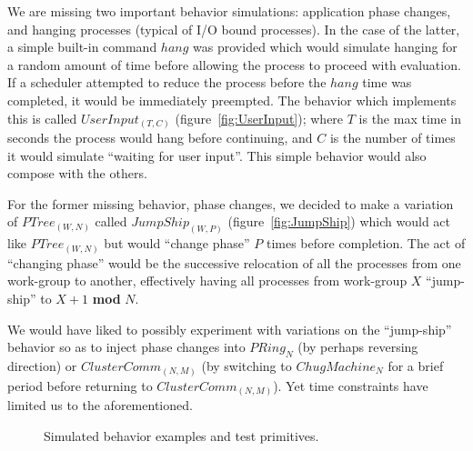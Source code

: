 We are missing two important behavior simulations: application phase changes,
and hanging processes (typical of I/O bound processes). In the case of the 
latter, a simple built-in command $hang$ was provided which would simulate 
hanging for a random amount of time before allowing the process to proceed with
evaluation. If a scheduler attempted to reduce the process before the $hang$ 
time was completed, it would be immediately preempted. The behavior which 
implements this is called $UserInput_{(T,C)}$ (figure~\ref{fig:UserInput}); where $T$ is the max time in seconds
the process would hang before continuing, and $C$ is the number of times it 
would simulate ``waiting for user input''. This simple behavior would also
compose with the others.

For the former missing behavior, phase changes, we decided to make a variation
of $PTree_{(W,N)}$ called $JumpShip_{(W,P)}$ (figure~\ref{fig:JumpShip}) which would act like $PTree_{(W,N)}$ but would
``change phase'' $P$ times before completion. The act of ``changing phase'' would 
be the successive relocation of all the processes from one work-group to 
another, effectively having all processes from work-group $X$ ``jump-ship'' to
$X+1$ \textbf{mod} $N$.

We would have liked to possibly experiment with variations on the ``jump-ship''
behavior so as to inject phase changes into $PRing_N$ (by perhaps reversing
direction) or $ClusterComm_{(N,M)}$ (by switching to $ChugMachine_N$ for a 
brief period before returning to $ClusterComm_{(N,M)}$). Yet time constraints
have limited us to the aforementioned.

\begin{figure}
\hfill
{}

\hfill
{}

\hfill
{}
\caption{Simulated behavior examples and test primitives.}
\end{figure}


